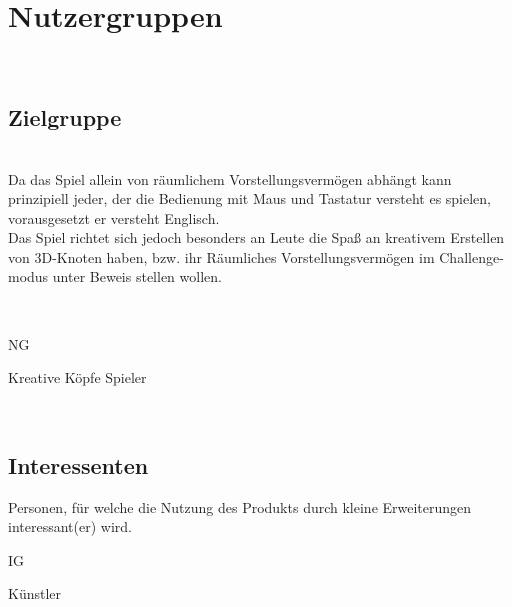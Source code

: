 %
%


\chapter{Nutzergruppen}
\label{NG}~\\


\section{Zielgruppe}
\label{NG:ZG}

~\\
Da das Spiel allein von räumlichem Vorstellungsvermögen abhängt kann prinzipiell jeder, der die Bedienung mit Maus und Tastatur versteht es spielen, vorausgesetzt er versteht Englisch.
\\
Das Spiel richtet sich jedoch besonders an Leute die Spaß an kreativem Erstellen von 3D-Knoten haben, bzw. ihr Räumliches Vorstellungsvermögen im Challenge-modus unter Beweis stellen wollen.

~\\

\begin{ids}{\gls{NG}}

	\id[10] Kreative Köpfe
	\id[20] Spieler

\end{ids}
~\\



\section{Interessenten}
\label{NG:Interessenten}

Personen, für welche die Nutzung des Produkts durch kleine Erweiterungen interessant(er) wird.\\


\begin{ids}{\gls{IG}}

	\id[30] Künstler

\end{ids}
